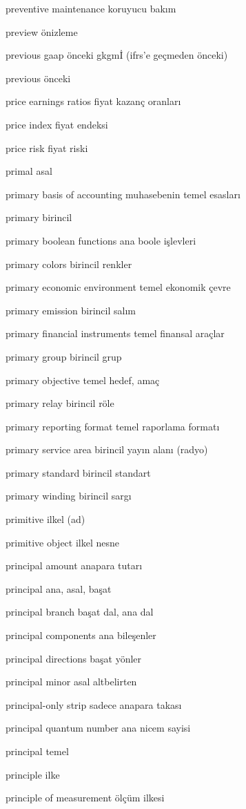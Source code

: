 \documentclass[12pt,fleqn]{article}\usepackage{../../common}
\begin{document}
preventive maintenance koruyucu bakım

preview önizleme

previous gaap önceki gkgmİ (ifrs'e geçmeden önceki)

previous önceki

price earnings ratios fiyat kazanç oranları

price index fiyat endeksi

price risk fiyat riski

primal asal

primary basis of accounting muhasebenin temel esasları

primary birincil

primary boolean functions ana boole işlevleri

primary colors birincil renkler

primary economic environment temel ekonomik çevre

primary emission birincil salım

primary financial instruments temel finansal araçlar

primary group birincil grup

primary objective temel hedef, amaç

primary relay birincil röle

primary reporting format temel raporlama formatı

primary service area birincil yayın alanı (radyo)

primary standard birincil standart

primary winding birincil sargı

primitive ilkel (ad)

primitive object ilkel nesne

principal amount anapara tutarı

principal ana, asal, başat

principal branch başat dal, ana dal

principal components ana bileşenler

principal directions başat yönler

principal minor asal altbelirten

principal-only strip sadece anapara takası

principal quantum number ana nicem sayisi

principal temel

principle ilke

principle of measurement ölçüm ilkesi
\end{document}
